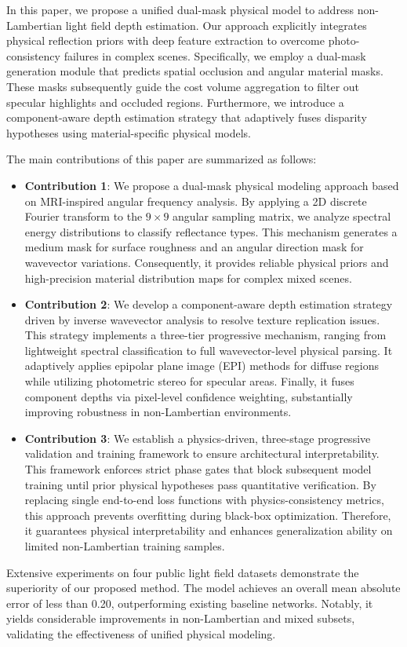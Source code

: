 In this paper, we propose a unified dual-mask physical model to address non-Lambertian light field depth estimation. Our approach explicitly integrates physical reflection priors with deep feature extraction to overcome photo-consistency failures in complex scenes. Specifically, we employ a dual-mask generation module that predicts spatial occlusion and angular material masks. These masks subsequently guide the cost volume aggregation to filter out specular highlights and occluded regions. Furthermore, we introduce a component-aware depth estimation strategy that adaptively fuses disparity hypotheses using material-specific physical models.

The main contributions of this paper are summarized as follows:

\begin{itemize}
  \item \textbf{Contribution 1}: We propose a dual-mask physical modeling approach based on MRI-inspired angular frequency analysis. By applying a 2D discrete Fourier transform to the $9 \times 9$ angular sampling matrix, we analyze spectral energy distributions to classify reflectance types. This mechanism generates a medium mask for surface roughness and an angular direction mask for wavevector variations. Consequently, it provides reliable physical priors and high-precision material distribution maps for complex mixed scenes.
  \item \textbf{Contribution 2}: We develop a component-aware depth estimation strategy driven by inverse wavevector analysis to resolve texture replication issues. This strategy implements a three-tier progressive mechanism, ranging from lightweight spectral classification to full wavevector-level physical parsing. It adaptively applies epipolar plane image (EPI) methods for diffuse regions while utilizing photometric stereo for specular areas. Finally, it fuses component depths via pixel-level confidence weighting, substantially improving robustness in non-Lambertian environments.
  \item \textbf{Contribution 3}: We establish a physics-driven, three-stage progressive validation and training framework to ensure architectural interpretability. This framework enforces strict phase gates that block subsequent model training until prior physical hypotheses pass quantitative verification. By replacing single end-to-end loss functions with physics-consistency metrics, this approach prevents overfitting during black-box optimization. Therefore, it guarantees physical interpretability and enhances generalization ability on limited non-Lambertian training samples.
\end{itemize}
Extensive experiments on four public light field datasets demonstrate the superiority of our proposed method. The model achieves an overall mean absolute error of less than 0.20, outperforming existing baseline networks. Notably, it yields considerable improvements in non-Lambertian and mixed subsets, validating the effectiveness of unified physical modeling.